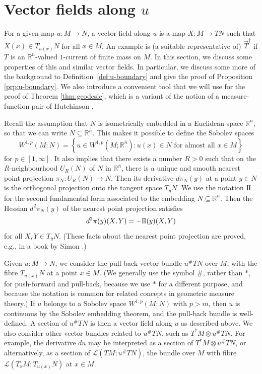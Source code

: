 \documentclass[10pt,a4paper]{amsart}
\newcommand{\R}{\mathbb{R}}
\newcommand{\ndim}{{\bar{n}}}
\newcommand{\Lin}{\mathcal{L}}
\newcommand{\sff}{\mathrm{I{\mkern -1mu}I}}
\newcommand{\set}[2]{\left\{ #1 \colon #2 \right\}}
\begin{document}
\section{Vector fields along $u$} \label{sct:vector-fields}

For a given map $u \colon M \to N$, a vector field along $u$ is a map
$X \colon M \to TN$ such that $X(x) \in T_{u(x)} N$ for all $x \in M$.
An example is (a suitable representative of) $\vec{T}^\dagger$ if
$T$ is an $\R^n$-valued $1$-current of finite mass on $M$.
In this section, we discuss some properties
of this and similar vector fields. In particular, we discuss some more of the
background to Definition~\ref{def:u-boundary} and give the proof of Proposition \ref{prp:u-boundary}. We also introduce a convenient tool that we will use for the proof of Theorem \ref{thm:geodesic},
which is a variant of the notion of a measure-function pair of Hutchinson \cite{Hutchinson:86}.

Recall the assumption that $N$ is isometrically embedded in a Euclidean space $\R^\ndim$, so that we can write $N \subseteq \R^\ndim$.
This makes it possible to define the Sobolev spaces
\[
W^{1, p}(M; N) = \set{u \in W^{1, p}(M; \R^\ndim)}{u(x) \in N \text{ for almost all } x \in M}
\]
for $p \in [1, \infty]$.
It also implies that there exists a number $R > 0$
such that on the $R$-neighbourhood $U_R(N)$ of $N$ in $\R^\ndim$,
there is a unique and smooth nearest point projection
$\pi_N \colon U_R(N) \to N$. Then its derivative $d\pi_N(y)$ at a point $y \in N$ is the orthogonal projection onto the tangent space $T_y N$.
We use the notation $\sff$ for the second fundamental form associated to the embedding $N \subseteq \R^\ndim$. Then the Hessian $d^2\pi_N(y)$ of the nearest point projection satisfies
\[
d^2\pi(y)(X, Y) = -\sff(y)(X, Y)
\]
for all $X, Y \in T_y N$. (These facts about the nearest point projection are proved, e.g., in a book by Simon \cite{Simon:96}.)

Given $u \colon M \to N$, we consider the pull-back vector bundle $u^\# TN$ over $M$, with the fibre $T_{u(x)} N$ at a point $x \in M$. (We generally use the symbol $\#$, rather than $*$, for push-forward and pull-back, because
we use $*$ for a different purpose, and because the notation is common for related concepts in geometric measure theory.)
If $u$ belongs to a Sobolev space $W^{1, p}(M; N)$ with $p > m$, then $u$
is continuous by the Sobolev embedding theorem, and the pull-back bundle is well-defined. A section of $u^\# TN$ is then a vector field along $u$ as described
above. We also consider other vector bundles related to $u^\# TN$, such as $T^* M \otimes u^\# TN$. For example, the derivative $du$ may be interpreted as a section
of $T^*M \otimes u^\# TN$, or alternatively, as a section of $\Lin(TM; u^\# TN)$,
the bundle over $M$ with fibre $\Lin(T_x M; T_{u(x)} N)$ at $x \in M$.
\end{document}

